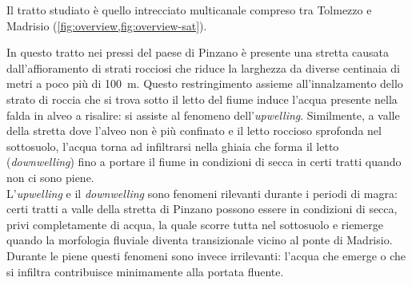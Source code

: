 Il tratto studiato è quello intrecciato multicanale compreso tra Tolmezzo e Madrisio (\vref{fig:overview,fig:overview-sat}). 

In questo tratto nei pressi del paese di Pinzano è presente una stretta causata dall'affioramento di strati rocciosi che riduce la larghezza da diverse centinaia di metri a poco più di \SI{100}{\m}.
Questo restringimento assieme all'innalzamento dello strato di roccia che si trova sotto il letto del fiume induce l'acqua presente nella falda in alveo a risalire: si assiste al fenomeno dell'\emph{upwelling}. 
Similmente, a valle della stretta dove l'alveo non è più confinato e il letto roccioso sprofonda nel sottosuolo, l'acqua torna ad infiltrarsi nella ghiaia che forma il letto (\emph{downwelling}) fino a portare il fiume in condizioni di secca in certi tratti quando non ci sono piene.
\\
L'\emph{upwelling} e il \emph{downwelling} sono fenomeni rilevanti durante i periodi di magra: certi tratti a valle della stretta di Pinzano possono essere in condizioni di secca, privi completamente di acqua, la quale scorre tutta nel sottosuolo e riemerge quando la morfologia fluviale diventa transizionale vicino al ponte di Madrisio.
Durante le piene questi fenomeni sono invece irrilevanti: l'acqua che emerge o che si infiltra contribuisce minimamente alla portata fluente.

